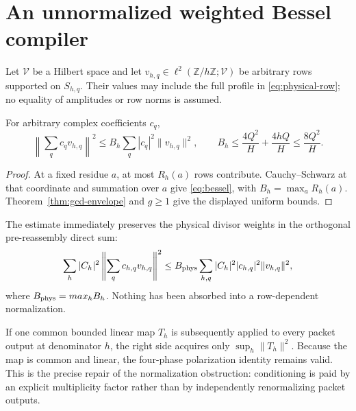 \section{An unnormalized weighted Bessel compiler}

Let $\mathcal V$ be a Hilbert space and let
$v_{h,q}\in\ell^2(\mathbb Z/h\mathbb Z;\mathcal V)$ be arbitrary rows supported on
$S_{h,q}$.  Their values may include the full profile in \eqref{eq:physical-row}; no
equality of amplitudes or row norms is assumed.

\begin{corollary}\label{cor:bessel}
For arbitrary complex coefficients $c_q$,
\begin{equation}
 \left\|\sum_qc_qv_{h,q}\right\|^2
 \le B_h\sum_q|c_q|^2\|v_{h,q}\|^2,
 \qquad
 B_h\le\frac{4Q^2}{H}+\frac{4hQ}{H}
      \le\frac{8Q^2}{H}.                              \label{eq:bessel}
\end{equation}
\end{corollary}

\begin{proof}
At a fixed residue $a$, at most $R_h(a)$ rows contribute.  Cauchy--Schwarz at that
coordinate and summation over $a$ give \eqref{eq:bessel}, with
$B_h=\max_aR_h(a)$.  Theorem~\ref{thm:gcd-envelope} and $g\ge1$ give the displayed
uniform bounds.
\end{proof}

The estimate immediately preserves the physical divisor weights in the orthogonal
pre-reassembly direct sum:
\begin{equation}
 \sum_h|C_h|^2\left\|\sum_qc_{h,q}v_{h,q}\right\|^2
 \le B_{\rm phys}
 \sum_{h,q}|C_h|^2|c_{h,q}|^2\|v_{h,q}\|^2,           \label{eq:weighted-direct-sum}
\end{equation}
where $B_{\rm phys}=max_hB_h$.  Nothing has been absorbed into a row-dependent
normalization.

If one common bounded linear map $T_h$ is subsequently applied to every packet output
at denominator $h$, the right side acquires only
$\sup_h\|T_h\|^2$.  Because the map is common and linear, the four-phase polarization
identity remains valid.  This is the precise repair of the normalization obstruction:
conditioning is paid by an explicit multiplicity factor rather than by independently
renormalizing packet outputs.
